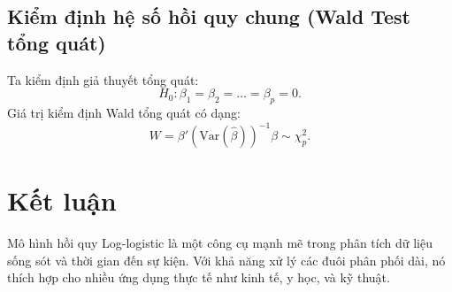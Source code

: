 \subsection{Kiểm định hệ số hồi quy chung (Wald Test tổng quát)}
Ta kiểm định giả thuyết tổng quát:
\begin{equation}
    H_0: \beta_1 = \beta_2 = \dots = \beta_p = 0.
\end{equation}
Giá trị kiểm định Wald tổng quát có dạng:
\begin{equation}
    W = \beta' \left( \text{Var}(\hat{\beta}) \right)^{-1} \beta \sim \chi^2_p.
\end{equation}

\section{Kết luận}
Mô hình hồi quy Log-logistic là một công cụ mạnh mẽ trong phân tích dữ liệu sống sót và thời gian đến sự kiện. Với khả năng xử lý các đuôi phân phối dài, nó thích hợp cho nhiều ứng dụng thực tế như kinh tế, y học, và kỹ thuật.

